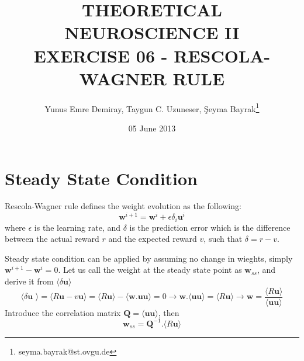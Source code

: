 \documentclass{article}
\begin{document}
\title{THEORETICAL NEUROSCIENCE II \\ EXERCISE 06 - RESCOLA-WAGNER RULE}
\date{05 June 2013}
\author[1]{Yunus Emre Demiray, Taygun C. Uzuneser, \c{S}eyma Bayrak\thanks{seyma.bayrak@st.ovgu.de}}
\maketitle

\newpage

\section{Steady State Condition}
Rescola-Wagner rule defines the weight evolution as the following:
\begin{equation}
 \textbf{w}^{i+1}=\textbf{w}^{i}+\epsilon \delta_i \textbf{u}^i
\end{equation}
where $\epsilon$ is the learning rate, and $\delta$ is the prediction error which is the difference between the actual reward $r$ and the expected reward $v$, such that $\delta=r-v$.

Steady state condition can be applied by assuming no change in wieghts, simply $\textbf{w}^{i+1}-\textbf{w}^{i}=0$. Let us call the weight at the steady state point as $\textbf{w}_{ss}$, and derive it from $\langle \delta \textbf{u} \rangle$
\begin{equation*}
 \langle \delta \textbf{u }\rangle=  \langle R\textbf{u} - v\textbf{u} \rangle =\langle R\textbf{u} \rangle - \langle \textbf{w}.\textbf{uu}  \rangle = 0 \longrightarrow \textbf{w}.\langle  \textbf{uu} \rangle=\langle R\textbf{u} \rangle \longrightarrow \textbf{w}=\frac{\langle R\textbf{u} \rangle}{\langle \textbf{uu} \rangle}
\end{equation*}
Introduce the correlation matrix $\textbf{Q}=\langle \textbf{uu} \rangle$, then
\begin{equation}
 \textbf{w}_{ss}=\textbf{Q}^{-1}.\langle R\textbf{u} \rangle
\end{equation}
\end{document}
